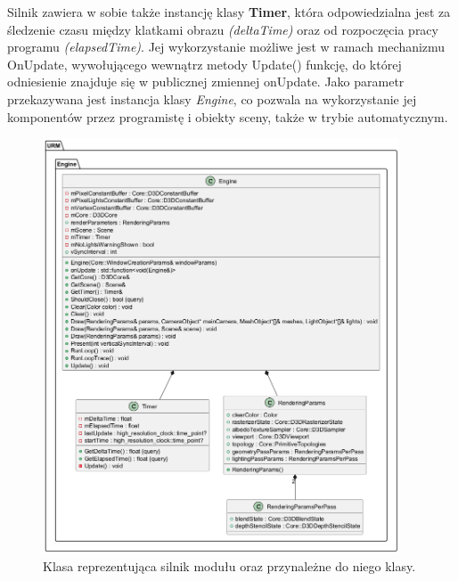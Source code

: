 	Silnik zawiera w sobie także instancję klasy \textbf{Timer}, która odpowiedzialna jest za śledzenie czasu między klatkami obrazu \textit{(deltaTime)} oraz od rozpoczęcia pracy programu \textit{(elapsedTime)}. Jej wykorzystanie możliwe jest w ramach mechanizmu OnUpdate, wywołującego wewnątrz metody Update() funkcję, do której odniesienie znajduje się w publicznej zmiennej onUpdate. Jako parametr przekazywana jest instancja klasy \textit{Engine}, co pozwala na wykorzystanie jej komponentów przez programistę i obiekty sceny, także w trybie automatycznym.
	
	\begin{figure}[h!]
		\centering
		\includegraphics[width=400px]{images/UML/engine.png}
		\caption{Klasa reprezentująca silnik modułu oraz przynależne do niego klasy.}
		\label{UML_Engine}
	\end{figure}